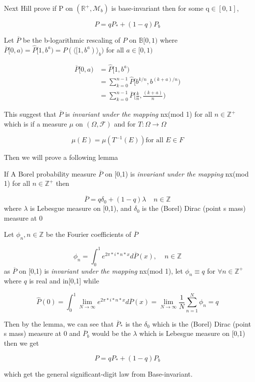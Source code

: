 \documentclass[12pt]{article}
\begin{document}
Next Hill prove if P on $(\mathbb{R}^+,\mathscr M_b)$ is base-invariant then  for some q$\in [0,1]$,

$$P=qP_*+(1-q)P_b$$

Let $\overline P$ be the b-logarithmic rescaling of $P$ on $\mathbb{B}[0,1)$ 
where $\overline P[0,a)=\widehat P[1,b^a)=P(\langle[1,b^a)\rangle_b)$ for all $a\in[0,1)$

\begin{equation*}
\begin{aligned}
\overline P[0,a) &=\widehat P[1,b^a)\\
&=\sum^{n-1}_{k=0}\widehat P[b^{k/n},b^{(k+a)/n})\\
&=\sum^{n-1}_{k=0}\overline P[\frac kn,\frac{(k+a)}n)
\end{aligned}
\end{equation*}

This suggest that $\overline P$ is \emph{invariant under the mapping} nx(mod 1) for all $n\in\mathbb{Z}^+$ which is if a measure $\mu$ on $(\Omega,\mathscr F)$ and for $T:\Omega \to \Omega$

$$\mu(E)=\mu(T^{-1}(E)) \text{for all }E\in F$$

Then we will prove a following lemma

If  A Borel probability measure $\overline P$ on [0,1) is \emph{invariant under the mapping} nx(mod 1) for all $n\in\mathbb{Z}^+$ then 

$$\overline P=q\delta_0+(1-q)\lambda \ \ \ \ \ n\in \mathbb Z$$
where $\lambda$ is Lebesgue measure on [0,1), and $\delta_0$ is the (Borel) Dirac (point s mass) measure at 0

Let $\phi_n,n\in\mathbb Z$ be the Fourier coefficients of $\overline P$

$$\phi_n=\int_0^1e^{2\pi*i*n*x}d\overline P(x),\ \ \ \ \ n\in\mathbb Z$$ as $\overline P$ on [0,1) is \emph{invariant under the mapping} nx(mod 1), let $\phi_n\equiv q$ for $\forall n\in \mathbb{Z}^+$where $q$ is real and in[0,1] while

$$\hat P({0})=\int_0^1\lim_{N\to \infty}e^{2\pi*i*n*x}d\overline P(x)=\lim_{N\to \infty}\frac1N\sum^N_{n=1}\phi_n=q$$


Then by the lemma, we can see that $\overline P_*$ is the $\delta_0$ which is  the (Borel) Dirac (point s mass) measure at 0 and $\overline P_b$ would be the $\lambda$ which is Lebesgue measure on [0,1) then we get

$$P=qP_*+(1-q)P_b$$

which get the general significant-digit law from Base-invariant.
\end{document}
